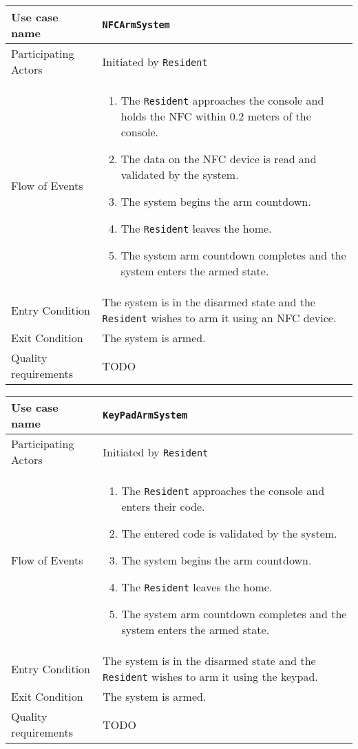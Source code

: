 \documentclass{report}
\begin{document}
\begin{tabular}{| l | p{7cm} |}
\hline
Use case name & \texttt{NFCArmSystem} \\ \hline
Participating Actors & Initiated by \texttt{Resident} \\ \hline
Flow of Events & 

\begin{enumerate}
 \item The \texttt{Resident} approaches the console and holds the NFC within 0.2 meters of the console.
 \item The data on the NFC device is read and validated by the system.
 \item The system begins the arm countdown.
 \item The \texttt{Resident} leaves the home.
 \item The system arm countdown completes and the system enters the armed state.
\end{enumerate}

\\ \hline

Entry Condition & The system is in the disarmed state and the \texttt{Resident} wishes to arm it 
using an NFC device. \\ \hline

Exit Condition & The system is armed. \\ \hline
Quality requirements & TODO \\ \hline

\hline
\end{tabular}

\begin{tabular}{| l | p{7cm} |}
\hline
Use case name & \texttt{KeyPadArmSystem} \\ \hline
Participating Actors & Initiated by \texttt{Resident} \\ \hline
Flow of Events & 

\begin{enumerate}
 \item The \texttt{Resident} approaches the console and enters their code.
 \item The entered code is validated by the system.
 \item The system begins the arm countdown.
 \item The \texttt{Resident} leaves the home.
 \item The system arm countdown completes and the system enters the armed state.
\end{enumerate}

\\ \hline

Entry Condition & The system is in the disarmed state and the \texttt{Resident} wishes to arm it
using the keypad. \\ \hline
Exit Condition & The system is armed. \\ \hline
Quality requirements & TODO \\ \hline

\hline
\end{tabular}
\end{document}
